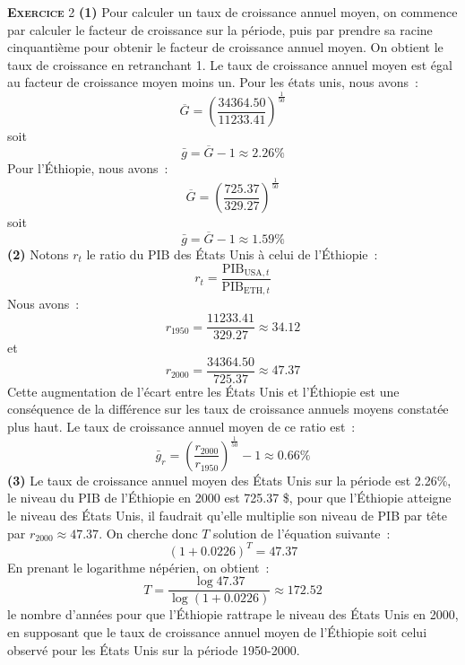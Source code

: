 \documentclass[10pt,a4paper,notitlepage]{report}
\newcommand{\exercice}[1]{\textsc{\textbf{Exercice}} #1}
\newcommand{\question}[1]{\textbf{(#1)}}
\begin{document}
\exercice{2} \question{1}  Pour calculer un taux  de croissance annuel
moyen,  on commence  par  calculer  le facteur  de  croissance sur  la
période,  puis par  prendre  sa racine  cinquantième  pour obtenir  le
facteur de croissance  annuel moyen. On obtient le  taux de croissance
en  retranchant 1.  Le taux  de croissance  annuel moyen  est égal  au
facteur  de croissance  moyen  moins  un. Pour  les  états unis,  nous
avons :
\[
\overline{G} = \left(\frac{34364.50}{11233.41}\right)^{\frac{1}{50}}
\]
soit
\[
\bar g = \overline{G} - 1 \approx 2.26\%
\]
Pour l'Éthiopie, nous avons :
\[
\overline{G} = \left(\frac{725.37}{329.27}\right)^{\frac{1}{50}}
\]
soit
\[
\bar g = \overline{G} - 1 \approx 1.59\%
\]
\question{2} Notons $r_t$ le ratio du PIB des États Unis à celui de l'Éthiopie :
\[
r_t = \frac{\text{PIB}_{\text{USA},t}}{\text{PIB}_{\text{ETH},t}}
\]
Nous avons :
\[
r_{1950} = \frac{11233.41}{329.27} \approx 34.12
\]
et
\[
r_{2000} = \frac{34364.50}{725.37} \approx 47.37 
\]
Cette augmentation de  l'écart entre les États Unis  et l'Éthiopie est
une conséquence  de la différence  sur les taux de  croissance annuels
moyens constatée plus  haut. Le taux de croissance annuel  moyen de ce
ratio est :
\[
\bar g_r = \left(\frac{r_{2000}}{r_{1950}}\right)^{\frac{1}{50}}-1 \approx 0.66\% 
\]
\question{3} Le taux de croissance annuel  moyen des États Unis sur la
période est 2.26\%, le niveau du  PIB de l'Éthiopie en 2000 est 725.37
\$, pour que l'Éthiopie atteigne le niveau des États Unis, il faudrait
qu'elle multiplie  son niveau  de PIB par  tête par  $r_{2000} \approx
47.37$. On cherche donc $T$ solution de l'équation suivante :
\[
(1+0.0226)^T = 47.37
\]
En prenant le logarithme népérien, on obtient :
\[
T = \frac{\log 47.37}{\log (1+0.0226)} \approx 172.52 
\]
le nombre  d'années pour que  l'Éthiopie rattrape le niveau  des États
Unis en 2000,  en supposant que le taux de  croissance annuel moyen de
l'Éthiopie  soit celui  observé pour  les  États Unis  sur la  période
1950-2000.

\bigskip
\bigskip
\end{document}
